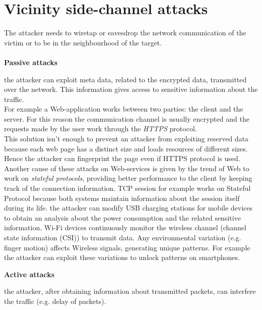 \section{Vicinity side-channel attacks}\label{SideCH:vicinity}
The attacker needs to wiretap or eavesdrop the network communication of the victim or to be in the neighbourhood of the target.\\\\
\textbf{Passive attacks}
\begin{itemize}
{the attacker can exploit meta data, related to the encrypted data, transmitted over the network. This information gives access to sensitive information about the traffic.\\
For example a Web-application works between two parties: the client and the server. For this reason the communication channel is usually encrypted and the requests made by the user work through the \textit{HTTPS} protocol.\\
This solution isn't enough to prevent an attacker from exploiting reserved data because each web page has a distinct size and loads resources of different sizes. Hence the attacker can fingerprint the page even if HTTPS protocol is used.\\
Another cause of these attacks on Web-services is given by the trend of Web to work on \textit{stateful protocols}, providing better performance to the client by keeping track of the connection information. TCP session for example works on Stateful Protocol because both systems maintain information about the session itself during its life\cite{side_leaks}.}
{the attacker can modify USB charging stations for mobile devices to obtain an analysis about the power consumption and the related sensitive information.}
{Wi-Fi devices continuously monitor the wireless channel (channel state information (CSI)) to transmit data. Any environmental variation (e.g. finger motion) affects Wireless signals, generating unique patterns. For example the attacker can exploit these variations to unlock patterns on smartphones\cite{side_CSI}.}
\end{itemize}
\textbf{Active attacks}
\begin{itemize}
{the attacker, after obtaining information about transmitted packets, can interfere the traffic (e.g. delay of packets).}
\end{itemize}


